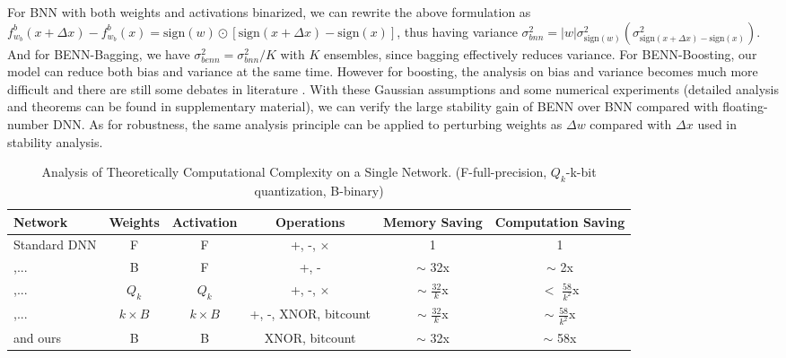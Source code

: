 \documentclass[10pt,twocolumn,letterpaper]{article}
\begin{document}
For BNN with both weights and activations binarized, we can rewrite the above formulation as $f_{w_{b}}^{b}(x+\Delta x) - f_{w_{b}}^{b}(x) = \text{sign}(w) \odot [\text{sign}(x+\Delta x) - \text{sign}(x)]$, thus having variance $\sigma_{bnn}^{2} = |w|\sigma_{\text{sign}(w)}^{2}(\sigma_{\text{sign}(x+\Delta x)-\text{sign}(x)}^{2})$. And for BENN-Bagging, we have $\sigma_{benn}^{2} = \sigma_{bnn}^{2} / K$ with $K$ ensembles, since bagging effectively reduces variance. For BENN-Boosting, our model can reduce both bias and variance at the same time. However for boosting, the analysis on bias and variance becomes much more difficult and there are still some debates in literature \cite{buhlmann2007boosting, friedman2000additive}. With these Gaussian assumptions and some numerical experiments (detailed analysis and theorems can be found in supplementary material), we can verify the large stability gain of BENN over BNN compared with floating-number DNN. As for robustness, the same analysis principle can be applied to perturbing weights as $\Delta w$ compared with $\Delta x$ used in stability analysis.

\begin{center}
    \begin{table*}
        \vspace{-3mm}
        \caption{{\small Analysis of Theoretically Computational Complexity on a Single Network. (F-full-precision, $Q_k$-k-bit quantization, B-binary)}}
        \centering
        \scriptsize
        \begin{tabular}{lccccc}
            \toprule
            \toprule
            Network & Weights & Activation & Operations & Memory Saving & Computation Saving  	\\
            \midrule
            Standard DNN &F & F & +, -, $\times$ & 1 & 1   \\
            \hline
            \cite{courbariaux2015binaryconnect,hwang2014fixed,li2016ternary,zhu2016trained,zhou2017incremental},...&B & F & +, - & $\sim$ 32x & $\sim$ 2x   \\
            \hline
            \cite{zhou2016dorefa,hubara2016quantized,wu2016quantized,anwar2015fixed},... &$Q_k$ & $Q_k$ & +, -, $\times$ & $\sim$ $\frac{32}{k}$x & $<$ $\frac{58}{k^2}$x   \\
            \hline
            \cite{lin2017towards},... &$k\times B$ & $k\times B$ & +, -, XNOR, bitcount & $\sim$ $\frac{32}{k}$x & $\sim$ $\frac{58}{k^2}$x  \\
            \hline
            \cite{rastegari2016xnor} and ours&B & B & XNOR, bitcount & $\sim$ 32x & $\sim$ 58x   \\
            \hline
            \bottomrule
        \end{tabular}
        \label{table:complex}
        \vspace{-1mm}
    \end{table*}
\end{center}
\end{document}
